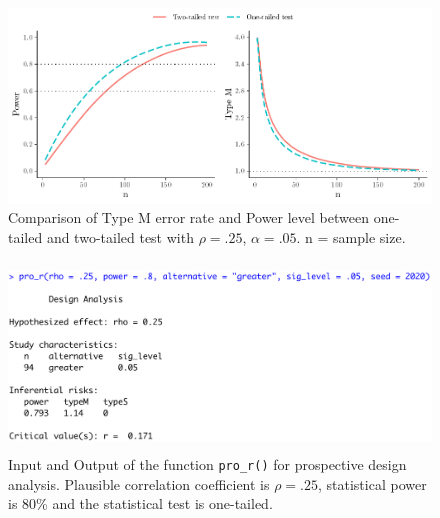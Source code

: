 \documentclass{article}\usepackage[]{graphicx}\usepackage[]{color}
\makeatletter
\def\maxwidth{ %
  \ifdim\Gin@nat@width>\linewidth
    \linewidth
  \else
    \Gin@nat@width
  \fi
}
\newenvironment{knitrout}{}{} %
\makeatother
\begin{document}
\begin{knitrout}
\color{fgcolor}\begin{figure}[!h]

{\centering \includegraphics[width=\maxwidth]{figure/Plot_hypothesis-1} 

}

\caption[Comparison of Type M error rate and Power level between one-tailed and two-tailed test with $\rho = .25$, $\alpha = .05$]{Comparison of Type M error rate and Power level between one-tailed and two-tailed test with $\rho = .25$, $\alpha = .05$. n = sample size. }\label{fig:Plot_hypothesis}
\end{figure}


\end{knitrout}




\begin{figure}[!h]
\centering
  \includegraphics[height=5cm]{screens/pro2}
\caption{Input and Output of the function \texttt{pro\_r()} for prospective design analysis. Plausible correlation coefficient is $\rho = .25$, statistical power is 80\% and the statistical test is one-tailed.}\label{fig:pro_r2}
\end{figure}
\end{document}
